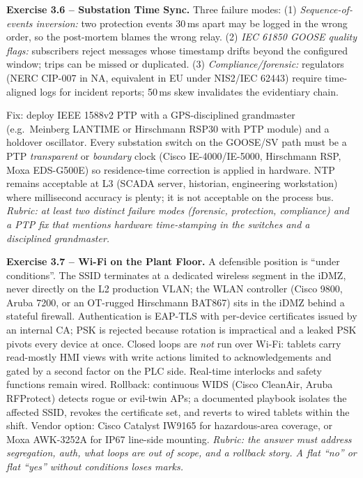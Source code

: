 \documentclass[11pt,a4paper]{article}
\begin{document}
\begin{solutionbox}
\textbf{Exercise 3.6 -- Substation Time Sync.}
Three failure modes: (1) \emph{Sequence-of-events inversion:} two protection events 30\,ms apart may be logged in the wrong order, so the post-mortem blames the wrong relay. (2) \emph{IEC 61850 GOOSE quality flags:} subscribers reject messages whose timestamp drifts beyond the configured window; trips can be missed or duplicated. (3) \emph{Compliance/forensic:} regulators (NERC CIP-007 in NA, equivalent in EU under NIS2/IEC 62443) require time-aligned logs for incident reports; 50\,ms skew invalidates the evidentiary chain.

Fix: deploy IEEE 1588v2 PTP with a GPS-disciplined grandmaster (e.g.\ Meinberg LANTIME or Hirschmann RSP30 with PTP module) and a holdover oscillator. Every substation switch on the GOOSE/SV path must be a PTP \emph{transparent} or \emph{boundary} clock (Cisco IE-4000/IE-5000, Hirschmann RSP, Moxa EDS-G500E) so residence-time correction is applied in hardware. NTP remains acceptable at L3 (SCADA server, historian, engineering workstation) where millisecond accuracy is plenty; it is not acceptable on the process bus. \emph{Rubric: at least two distinct failure modes (forensic, protection, compliance) and a PTP fix that mentions hardware time-stamping in the switches and a disciplined grandmaster.}
\end{solutionbox}

\begin{solutionbox}
\textbf{Exercise 3.7 -- Wi-Fi on the Plant Floor.}
A defensible position is ``under conditions''. The SSID terminates at a dedicated wireless segment in the iDMZ, never directly on the L2 production VLAN; the WLAN controller (Cisco 9800, Aruba 7200, or an OT-rugged Hirschmann BAT867) sits in the iDMZ behind a stateful firewall. Authentication is EAP-TLS with per-device certificates issued by an internal CA; PSK is rejected because rotation is impractical and a leaked PSK pivots every device at once. Closed loops are \emph{not} run over Wi-Fi: tablets carry read-mostly HMI views with write actions limited to acknowledgements and gated by a second factor on the PLC side. Real-time interlocks and safety functions remain wired. Rollback: continuous WIDS (Cisco CleanAir, Aruba RFProtect) detects rogue or evil-twin APs; a documented playbook isolates the affected SSID, revokes the certificate set, and reverts to wired tablets within the shift. Vendor option: Cisco Catalyst IW9165 for hazardous-area coverage, or Moxa AWK-3252A for IP67 line-side mounting. \emph{Rubric: the answer must address segregation, auth, what loops are out of scope, and a rollback story. A flat ``no'' or flat ``yes'' without conditions loses marks.}
\end{solutionbox}
\end{document}
